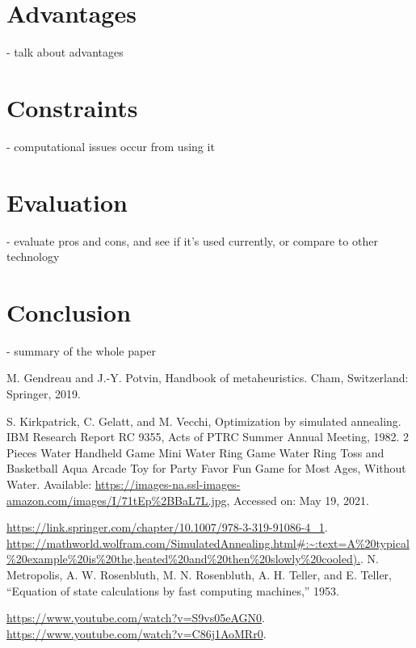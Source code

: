 \documentclass[conference]{IEEEtran}
\begin{document}
\section{Advantages}
- talk about advantages

\section{Constraints}
- computational issues occur from using it

\section{Evaluation}
- evaluate pros and cons, and see if it's used currently, or compare to other technology

\section{Conclusion}
- summary of the whole paper

\begin{thebibliography}{00}
 M. Gendreau and J.-Y. Potvin, Handbook of metaheuristics. Cham, Switzerland: Springer, 2019. 

 S. Kirkpatrick, C. Gelatt, and M. Vecchi, Optimization by simulated annealing. IBM Research Report RC 9355, Acts of PTRC Summer Annual Meeting, 1982.
 2 Pieces Water Handheld Game Mini Water Ring Game Water Ring Toss and Basketball Aqua Arcade Toy for Party Favor Fun Game for Most Ages, Without Water. Available: \url{https://images-na.ssl-images-amazon.com/images/I/71tEp%2BBaL7L.jpg}, Accessed on: May 19, 2021.

 \url{https://link.springer.com/chapter/10.1007/978-3-319-91086-4_1}.
 \url{https://mathworld.wolfram.com/SimulatedAnnealing.html#:~:text=A%20typical%20example%20is%20the,heated%20and%20then%20slowly%20cooled).}.
 N. Metropolis, A. W. Rosenbluth, M. N. Rosenbluth, A. H. Teller, and E. Teller, “Equation of state calculations by fast computing machines,” 1953. 

 \url{https://www.youtube.com/watch?v=S9vs05eAGN0}.
 \url{https://www.youtube.com/watch?v=C86j1AoMRr0}.

\end{thebibliography}
\end{document}
